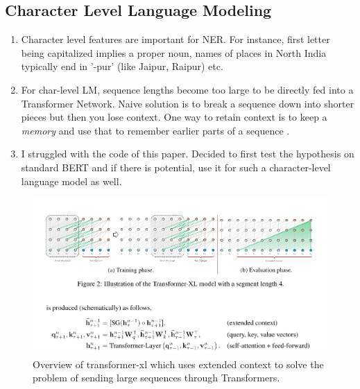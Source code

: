 \subsection{Character Level Language Modeling}
\begin{enumerate}
	\item Character level features are important for NER. For instance, first letter being capitalized implies a proper noun, names of places in North India typically end in '-pur' (like Jaipur, Raipur) etc.
	\item For char-level LM, sequence lengths become too large to be directly fed into a Transformer Network. Naive solution is to break a sequence down into shorter pieces but then you lose context. One way to retain context is to keep a \textit{memory} and use that to remember earlier parts of a sequence \cite{transformerxl}.
	\item I struggled with the code of this paper. Decided to first test the hypothesis on standard BERT and if there is potential, use it for such a character-level language model as well.
\end{enumerate}

\begin{figure}[h!]
	\includegraphics[scale=0.5]{images/transformerxl}
	\caption{\label{fig:transformerxl}Overview of transformer-xl which uses extended context to solve the problem of sending large sequences through Transformers.}
\end{figure}

